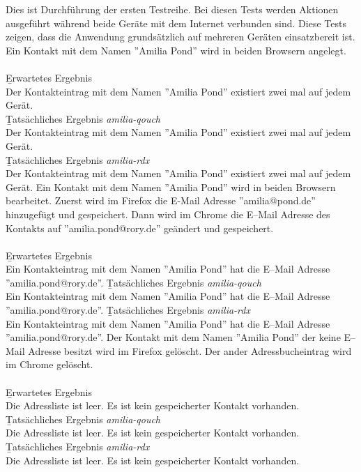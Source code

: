 Dies ist Durchführung der ersten Testreihe.
Bei diesen Tests werden Aktionen ausgeführt während beide Geräte mit dem Internet verbunden sind.
Diese Tests zeigen, dass die Anwendung grundsätzlich auf mehreren Geräten einsatzbereit ist.
%
Ein Kontakt mit dem Namen ''Amilia Pond'' wird in beiden Browsern angelegt.\\\\
\b{Erwartetes Ergebnis}\\
Der Kontakteintrag mit dem Namen ''Amilia Pond'' existiert zwei mal auf jedem Gerät.\\
\b{Tatsächliches Ergebnis \it{amilia-qouch}}\\
Der Kontakteintrag mit dem Namen ''Amilia Pond'' existiert zwei mal auf jedem Gerät.\\
\b{Tatsächliches Ergebnis \it{amilia-rdx}}\\
Der Kontakteintrag mit dem Namen ''Amilia Pond'' existiert zwei mal auf jedem Gerät.
%
Ein Kontakt mit dem Namen ''Amilia Pond'' wird in beiden Browsern bearbeitet.
Zuerst wird im Firefox die E-Mail Adresse ''amilia@pond.de'' hinzugefügt und gespeichert.
Dann wird im Chrome die E--Mail Adresse des Kontakts auf ''amilia.pond@rory.de'' geändert und gespeichert.\\\\
\b{Erwartetes Ergebnis}\\
Ein Kontakteintrag mit dem Namen ''Amilia Pond'' hat die E--Mail Adresse ''amilia.pond@rory.de''.
\b{Tatsächliches Ergebnis \it{amilia-qouch}}\\
Ein Kontakteintrag mit dem Namen ''Amilia Pond'' hat die E--Mail Adresse ''amilia.pond@rory.de''.
\b{Tatsächliches Ergebnis \it{amilia-rdx}}\\
Ein Kontakteintrag mit dem Namen ''Amilia Pond'' hat die E--Mail Adresse ''amilia.pond@rory.de''.
%
Der Kontakt mit dem Namen ''Amilia Pond'' der keine E--Mail Adresse besitzt wird im Firefox gelöscht. Der ander Adressbucheintrag wird im Chrome gelöscht.\\\\
\b{Erwartetes Ergebnis}\\
Die Adressliste ist leer. Es ist kein gespeicherter Kontakt vorhanden.\\
\b{Tatsächliches Ergebnis \it{amilia-qouch}}\\
Die Adressliste ist leer. Es ist kein gespeicherter Kontakt vorhanden.\\
\b{Tatsächliches Ergebnis \it{amilia-rdx}}\\
Die Adressliste ist leer. Es ist kein gespeicherter Kontakt vorhanden.